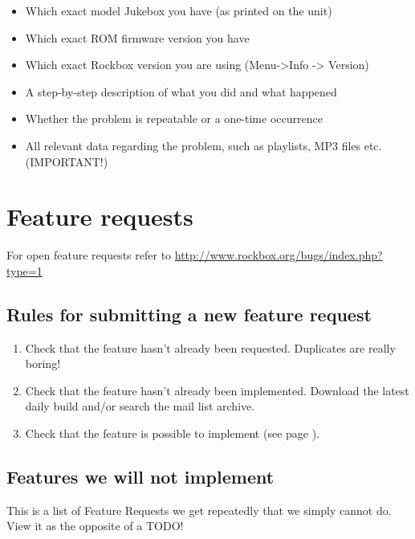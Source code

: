 \begin{itemize}
\item  Which exact model Jukebox you have (as printed on the unit)
\item  Which exact ROM firmware version you have
\item  Which exact Rockbox version you are using
(Menu{}-{\textgreater}Info {}-{\textgreater} Version)
\item  A step{}-by{}-step description of what you did and what happened
\item  Whether the problem is repeatable or a one{}-time occurrence
\item  All relevant data regarding the problem, such as playlists, MP3
files etc. (IMPORTANT!) 
\end{itemize}

\section{Feature requests}
For open feature requests refer to
\url{http://www.rockbox.org/bugs/index.php?type=1}

\subsection{Rules for submitting a new feature request}

\begin{enumerate}
\item Check that the feature hasn't already been requested. 
  Duplicates are really boring!
\item Check that the feature hasn't already been implemented. 
  Download the latest daily build and/or search the mail list archive.
\item Check that the feature is possible to implement (see page \pageref{ref:NODO}).
\end{enumerate}

\subsection{\label{ref:NODO}Features we will not implement}
This is a list of Feature Requests we get repeatedly that we simply
cannot do. View it as the opposite of a TODO!

